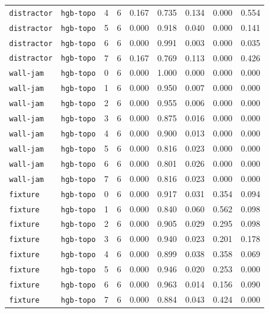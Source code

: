 \documentclass{article}
\begin{document}
\begin{center}
\begin{tabular}{lllcccccc}
\texttt{distractor} & \texttt{hgb-topo} & 4 & 6 & 0.167 & 0.735 & 0.134 & 0.000 & 0.554 \\
\texttt{distractor} & \texttt{hgb-topo} & 5 & 6 & 0.000 & 0.918 & 0.040 & 0.000 & 0.141 \\
\texttt{distractor} & \texttt{hgb-topo} & 6 & 6 & 0.000 & 0.991 & 0.003 & 0.000 & 0.035 \\
\texttt{distractor} & \texttt{hgb-topo} & 7 & 6 & 0.167 & 0.769 & 0.113 & 0.000 & 0.426 \\
\texttt{wall-jam} & \texttt{hgb-topo} & 0 & 6 & 0.000 & 1.000 & 0.000 & 0.000 & 0.000 \\
\texttt{wall-jam} & \texttt{hgb-topo} & 1 & 6 & 0.000 & 0.950 & 0.007 & 0.000 & 0.000 \\
\texttt{wall-jam} & \texttt{hgb-topo} & 2 & 6 & 0.000 & 0.955 & 0.006 & 0.000 & 0.000 \\
\texttt{wall-jam} & \texttt{hgb-topo} & 3 & 6 & 0.000 & 0.875 & 0.016 & 0.000 & 0.000 \\
\texttt{wall-jam} & \texttt{hgb-topo} & 4 & 6 & 0.000 & 0.900 & 0.013 & 0.000 & 0.000 \\
\texttt{wall-jam} & \texttt{hgb-topo} & 5 & 6 & 0.000 & 0.816 & 0.023 & 0.000 & 0.000 \\
\texttt{wall-jam} & \texttt{hgb-topo} & 6 & 6 & 0.000 & 0.801 & 0.026 & 0.000 & 0.000 \\
\texttt{wall-jam} & \texttt{hgb-topo} & 7 & 6 & 0.000 & 0.816 & 0.023 & 0.000 & 0.000 \\
\texttt{fixture} & \texttt{hgb-topo} & 0 & 6 & 0.000 & 0.917 & 0.031 & 0.354 & 0.094 \\
\texttt{fixture} & \texttt{hgb-topo} & 1 & 6 & 0.000 & 0.840 & 0.060 & 0.562 & 0.098 \\
\texttt{fixture} & \texttt{hgb-topo} & 2 & 6 & 0.000 & 0.905 & 0.029 & 0.295 & 0.098 \\
\texttt{fixture} & \texttt{hgb-topo} & 3 & 6 & 0.000 & 0.940 & 0.023 & 0.201 & 0.178 \\
\texttt{fixture} & \texttt{hgb-topo} & 4 & 6 & 0.000 & 0.899 & 0.038 & 0.358 & 0.069 \\
\texttt{fixture} & \texttt{hgb-topo} & 5 & 6 & 0.000 & 0.946 & 0.020 & 0.253 & 0.000 \\
\texttt{fixture} & \texttt{hgb-topo} & 6 & 6 & 0.000 & 0.963 & 0.014 & 0.156 & 0.090 \\
\texttt{fixture} & \texttt{hgb-topo} & 7 & 6 & 0.000 & 0.884 & 0.043 & 0.424 & 0.000 \\
\bottomrule
\end{tabular}
\end{center}
\end{document}

